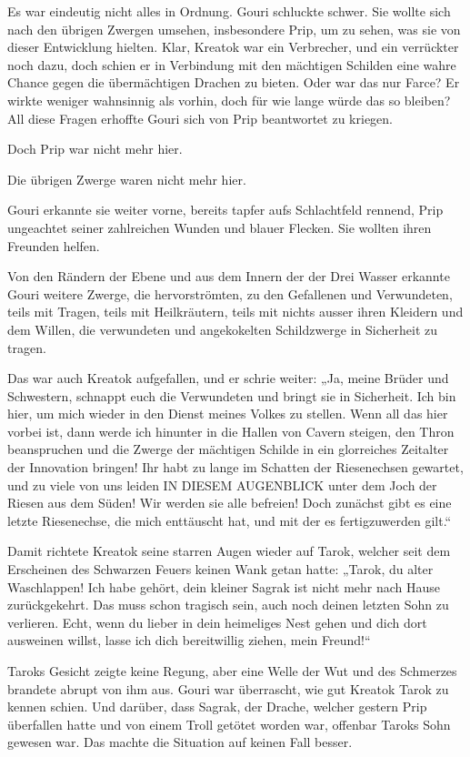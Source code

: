 Es war eindeutig nicht alles in Ordnung. Gouri schluckte schwer. Sie wollte sich nach den übrigen Zwergen umsehen, insbesondere Prip, um zu sehen, was sie von dieser Entwicklung hielten. Klar, Kreatok war ein Verbrecher, und ein verrückter noch dazu, doch schien er in Verbindung mit den mächtigen Schilden eine wahre Chance gegen die übermächtigen Drachen zu bieten. Oder war das nur Farce? Er wirkte weniger wahnsinnig als vorhin, doch für wie lange würde das so bleiben? All diese Fragen erhoffte Gouri sich von Prip beantwortet zu kriegen.

Doch Prip war nicht mehr hier.

Die übrigen Zwerge waren nicht mehr hier.

Gouri erkannte sie weiter vorne, bereits tapfer aufs Schlachtfeld rennend, Prip ungeachtet seiner zahlreichen Wunden und blauer Flecken. Sie wollten ihren Freunden helfen.

Von den Rändern der Ebene und aus dem Innern der der Drei Wasser erkannte Gouri weitere Zwerge, die hervorströmten, zu den Gefallenen und Verwundeten, teils mit Tragen, teils mit Heilkräutern, teils mit nichts ausser ihren Kleidern und dem Willen, die verwundeten und angekokelten Schildzwerge in Sicherheit zu tragen.

Das war auch Kreatok aufgefallen, und er schrie weiter: „Ja, meine Brüder und Schwestern, schnappt euch die Verwundeten und bringt sie in Sicherheit. Ich bin hier, um mich wieder in den Dienst meines Volkes zu stellen. Wenn all das hier vorbei ist, dann werde ich hinunter in die Hallen von Cavern steigen, den Thron beanspruchen und die Zwerge der mächtigen Schilde in ein glorreiches Zeitalter der Innovation bringen! Ihr habt zu lange im Schatten der Riesenechsen gewartet, und zu viele von uns leiden IN DIESEM AUGENBLICK unter dem Joch der Riesen aus dem Süden! Wir werden sie alle befreien! Doch zunächst gibt es eine letzte Riesenechse, die mich enttäuscht hat, und mit der es fertigzuwerden gilt.“

Damit richtete Kreatok seine starren Augen wieder auf Tarok, welcher seit dem Erscheinen des Schwarzen Feuers keinen Wank getan hatte: „Tarok, du alter Waschlappen! Ich habe gehört, dein kleiner Sagrak ist nicht mehr nach Hause zurückgekehrt. Das muss schon tragisch sein, auch noch deinen letzten Sohn zu verlieren. Echt, wenn du lieber in dein heimeliges Nest gehen und dich dort ausweinen willst, lasse ich dich bereitwillig ziehen, mein Freund!“

Taroks Gesicht zeigte keine Regung, aber eine Welle der Wut und des Schmerzes brandete abrupt von ihm aus. Gouri war überrascht, wie gut Kreatok Tarok zu kennen schien. Und darüber, dass Sagrak, der Drache, welcher gestern Prip überfallen hatte und von einem Troll getötet worden war, offenbar Taroks Sohn gewesen war. Das machte die Situation auf keinen Fall besser.

